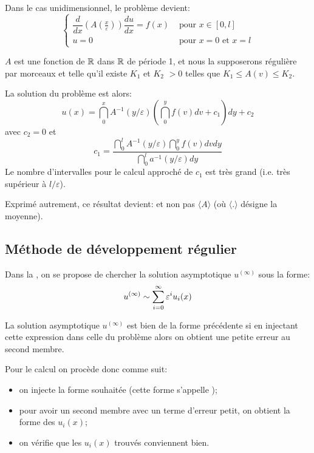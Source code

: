 Dans le cas unidimensionnel, le problème devient:
\begin{equation}
\left\{
\begin{array}{ll}
\dfrac d{dx}\left(A(\frac x\varepsilon)\right) \dfrac{du}{dx} = f(x)& \text{ pour } x\in[0,l]\\
u=0 &\text{ pour } x=0 \text{ et } x=l
\end{array}
\right.
\end{equation}

$A$ est une fonction de $\mathbb R$ dans $\mathbb R$ de période 1, et nous la supposerons régulière
par morceaux et telle qu'il existe $K_1$ et $K_2$ $>0$ telles que $K_1\le A(v)\le K_2$.

La solution du problème est alors:
\begin{equation}
u(x)=\dint_0^x A^{-1}(y/\varepsilon) \left(\dint_0^y f(v)dv + c_1 \right) dy + c_2
\end{equation}
avec $c_2=0$ et 
\begin{equation} c_1 = \dfrac{\dint_0^l A^{-1}(y/\varepsilon)\dint_0^y f(v)dv dy}{\dint_0^l a^{-1}(y/\varepsilon)dy} \end{equation}
Le nombre d'intervalles pour le calcul approché de $c_1$ est très grand (i.e. très supérieur
à $l/\varepsilon$).

Exprimé autrement, ce résultat devient:
 et non pas $\langle A\rangle$ 
(où $\langle.\rangle$ désigne la moyenne).


\medskip
\subsection{Méthode de développement régulier}

Dans la , on se propose de chercher la
solution asymptotique $u^{(\infty)}$ sous la forme:
\begin{equation}
u^{(\infty)} \sim \displaystyle\sum_{i=0}^\infty \varepsilon^iu_i(x)
\end{equation}

\medskip
La solution asymptotique $u^{(\infty)}$ est bien de la forme précédente si en injectant
cette expression dans celle du problème alors on obtient une petite erreur au second membre.

\medskip
Pour le calcul on procède donc comme suit:
\begin{itemize}
   \item on injecte la forme souhaitée (cette forme s'appelle );
   \item pour avoir un second membre avec un terme d'erreur petit, on obtient la forme des $u_i(x)$;
   \item on vérifie que les $u_i(x)$ trouvés conviennent bien.
\end{itemize}


